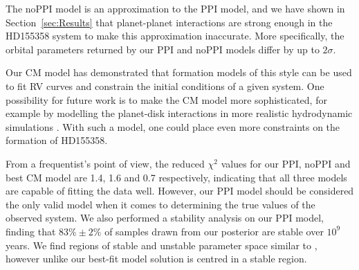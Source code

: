 The noPPI model is an approximation to the PPI model, and we have shown in Section~\ref{sec:Results} that planet-planet interactions are strong enough in the HD155358 system to make this approximation inaccurate.
More specifically, the orbital parameters returned by our PPI and noPPI models differ by up to $2\sigma$.

Our CM model has demonstrated that formation models of this style can be used to fit RV curves and constrain the initial conditions of a given system. 
One possibility for future work is to make the CM model more sophisticated, for example by modelling the planet-disk interactions in more realistic hydrodynamic simulations \citep{Rein2010}. 
With such a model, one could place even more constraints on the formation of HD155358.

From a frequentist's point of view, the reduced $\chi^2$ values for our PPI, noPPI and best CM model are 1.4, 1.6 and 0.7 respectively, indicating that all three models are capable of fitting the data well.
However, our PPI model should be considered the only valid model when it comes to determining the true values of the observed system.
We also performed a stability analysis on our PPI model, finding that $83\% \pm 2\%$ of samples drawn from our posterior are stable over $10^9$ years.
We find regions of stable and unstable parameter space similar to \R, however unlike \R our best-fit model solution is centred in a stable region. 
